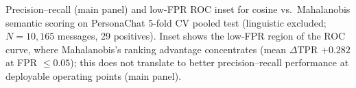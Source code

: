 Precision--recall (main panel) and low-FPR ROC inset for cosine vs.\ Mahalanobis semantic scoring on PersonaChat 5-fold CV pooled test (linguistic excluded; $N{=}10{,}165$ messages, 29 positives). Inset shows the low-FPR region of the ROC curve, where Mahalanobis's ranking advantage concentrates (mean $\Delta$TPR $+0.282$ at FPR $\leq 0.05$); this does not translate to better precision--recall performance at deployable operating points (main panel).
